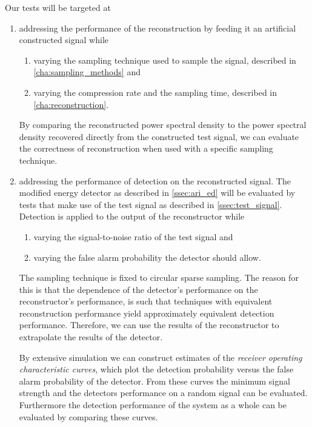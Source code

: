 \documentclass[a4paper, openany, oneside]{memoir}
\begin{document}
Our tests will be targeted at
\begin{enumerate}
	\item addressing the performance of the reconstruction by feeding it an artificial constructed signal while
	\begin{enumerate}
		\item varying the sampling technique used to sample the signal, described in \cref{cha:sampling_methods} and
		\item varying the compression rate and the sampling time, described in \cref{cha:reconstruction}.
	\end{enumerate}
	By comparing the reconstructed power spectral density to the power spectral density recovered directly from the constructed test signal, we can evaluate the correctness of reconstruction when used with a specific sampling technique.
	\item addressing the performance of detection on the reconstructed signal. The modified energy detector as described in \cref{ssec:ari_ed} will be evaluated by tests that make use of the test signal as described in \cref{ssec:test_signal}. 
	Detection is applied to the output of the reconstructor while	
	\begin{enumerate}
		\item varying the signal-to-noise ratio of the test signal and
		\item varying the false alarm probability the detector 
		should allow.
	\end{enumerate}

	The sampling technique is fixed to circular sparse sampling. The reason for this is that the dependence of the detector's performance on the reconstructor's performance, is such that techniques with equivalent reconstruction performance yield approximately equivalent detection performance. Therefore, we can use the results of the reconstructor to extrapolate the results of the detector.

	By extensive simulation we can construct estimates of the \emph{receiver operating characteristic curves}, which plot the detection probability versus the false alarm probability of the detector. From these curves the minimum signal strength and the detectors performance on a random signal can be evaluated. Furthermore the detection performance of the system as a whole can be evaluated by comparing these curves.
	\end{enumerate}
\end{document}
